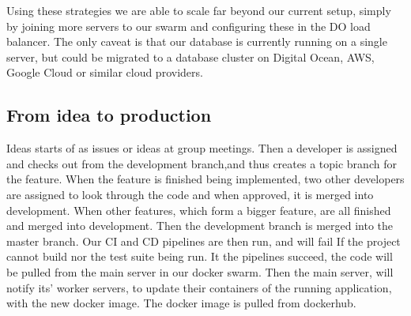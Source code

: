 Using these strategies we are able to scale far beyond our current setup, simply by joining more servers to our swarm and configuring these in the DO load balancer.
The only caveat is that our database is currently running on a single server, but could be migrated to a database cluster on Digital Ocean, AWS, Google Cloud or similar cloud providers.

\subsection{From idea to production}

Ideas starts of as issues or ideas at group meetings.
Then a developer is assigned and checks out from the development branch,and thus creates a topic branch for the feature.
When the feature is finished being implemented, two other developers are assigned to look through the code and when approved, it is merged into development.
When other features, which form a bigger feature, are all finished and merged into development.
Then the development branch is merged into the master branch.
Our CI and CD pipelines are then run, and will fail 
If the project cannot build nor the test suite being run.
It the pipelines succeed, the code will be pulled from the main server in our docker swarm.
Then the main server, will notify its' worker servers, to update their containers of the running application, with the new docker image. The docker image is pulled from dockerhub.
